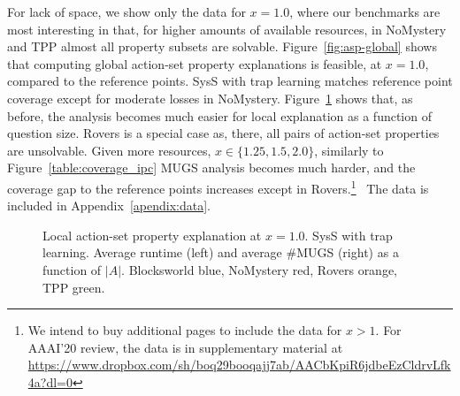 For lack of space, we show only the data for $x = 1.0$, where our
benchmarks are most interesting in that, for higher amounts of
available resources, in NoMystery and TPP almost all property subsets
are solvable.
%
Figure~\ref{fig:asp-global} shows that computing global action-set
property explanations is feasible, at $x=1.0$, compared to the
reference points. SysS with trap learning matches reference point
coverage except for moderate losses in NoMystery.
%
Figure~\ref{fig:asp-local} shows that, as before, the analysis becomes
much easier for local explanation as a function of question size.
%
Rovers is a special case as, there, all pairs of action-set properties
are unsolvable.
%
Given more resources, $x \in \{1.25, 1.5, 2.0\}$, 
%
%
%
similarly to Figure~\ref{table:coverage_ipc} MUGS analysis becomes
much harder, and the coverage gap to the reference points increases
except in Rovers.\ifdefined\suppflagdefined\else\footnote{We intend to
buy additional pages to include the data for $x > 1$. For AAAI'20
review, the data is in supplementary material at
{\scriptsize \url{https://www.dropbox.com/sh/boq29booqajj7ab/AACbKpiR6jdbeEzCldrvLfk4a?dl=0}}}\fi\
%
\ifdefined\suppflagdefined
%
The data is included in Appendix~\ref{apendix:data}.
%
\fi


\begin{figure}[t]
\vspace{-0.0cm}
\small
\centering


\vspace{-0.3cm}
\caption{\label{fig:asp-local} Local action-set property explanation 
at $x=1.0$. SysS with trap learning. Average runtime (left) and
average \#MUGS (right) as a function of $|A|$. Blocksworld blue,
NoMystery red, Rovers orange, TPP green.}
%
\vspace{-0.6cm}
\end{figure}











